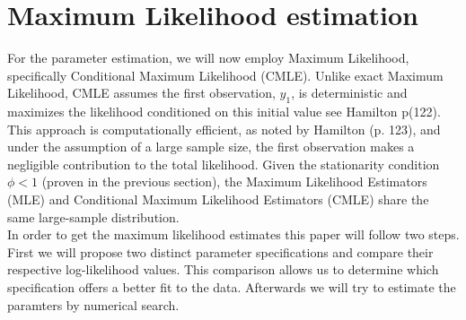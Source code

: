 \documentclass[12pt]{article}
\begin{document}
\section{Maximum Likelihood estimation}
For the parameter estimation, we will now employ Maximum Likelihood, specifically Conditional Maximum Likelihood (CMLE). 
Unlike exact Maximum Likelihood, CMLE assumes the first observation, $y_1$, is deterministic and maximizes the likelihood conditioned on this initial value see Hamilton p(122).
This approach is computationally efficient, as noted by Hamilton (p. 123), and under the assumption of a large sample size, the first observation makes a negligible contribution to the total likelihood. 
Given the stationarity condition $\phi < 1$ (proven in the previous section), the Maximum Likelihood Estimators (MLE) and Conditional Maximum Likelihood Estimators (CMLE) share the same large-sample distribution.\\
In order to get the maximum likelihood estimates this paper will follow two steps. First we will propose two distinct parameter specifications and compare their respective log-likelihood values. This comparison allows us to determine which specification offers a better fit to the data.
Afterwards we will try to estimate the paramters by numerical search.
\end{document}

